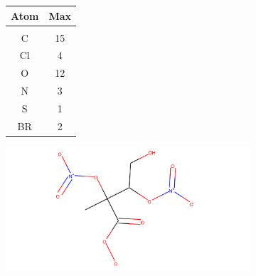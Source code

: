 \begin{figure}[H]
     \centering
     \begin{subfigure}[b]{0.325\textwidth}
         \centering
         \begin{tabular}{c|c}
         \textbf{Atom} & \textbf{Max}\\
         \hline\hline
         &\\
             C & 15 \\
             Cl & 4 \\
             O & 12\\
             N&3\\
             S&1\\
             BR&2\\
         \end{tabular}
          \caption{}
         \label{table:my_maxoccur}
     \end{subfigure}
     \begin{subfigure}[b]{0.325\textwidth}
         \centering
         \includegraphics[width=\textwidth,height=.8\textwidth]{4fig/INB1NBCO3.pdf}
         \caption{}
         \label{fig:graphmol}
     \end{subfigure}
     \hfill
     \begin{subfigure}[b]{0.325\textwidth}
         \centering

\end{subfigure}
\end{figure}
